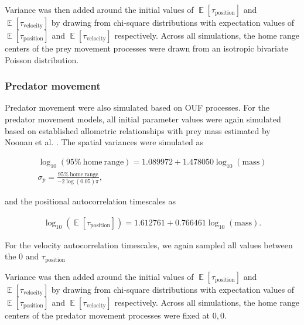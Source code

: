 \documentclass[12pt]{article}
\DeclareMathOperator{\E}{\mathbb{E}}
\begin{document}

Variance was then added around the initial values of $\E[\tau_\mathrm{position}]$ and $\E[\tau_\mathrm{velocity}]$ by drawing from chi-square distributions with expectation values of $\E[\tau_\mathrm{position}]$ and $\E[\tau_\mathrm{velocity}]$ respectively. Across all simulations, the home range centers of the prey movement processes were drawn from an isotropic bivariate Poisson distribution.

\subsubsection*{Predator movement}

Predator movement were also simulated based on OUF processes. For the predator movement models, all initial parameter values were again simulated based on established allometric relationships with prey mass estimated by Noonan et al. \cite{Noonan:2020}. The spatial variances were simulated as

\begin{gather}
\log_{10}(\mathrm{95\%~home~range}) = 1.089972 + 1.478050 \log_{10}(\mathrm{mass}) \\
\sigma_p = \frac{\mathrm{95\%~home~range}}{-2 \log(0.05)  \pi},
\end{gather}

and the positional autocorrelation timescales as

\begin{gather}
\log_{10}(\E[\tau_\mathrm{position}]) = 1.612761 + 0.766461 \log_{10}(\mathrm{mass}).
\end{gather}

For the velocity autocorrelation timescales, we again sampled all values between the 0 and $\tau_\mathrm{position}$


Variance was then added around the initial values of $\E[\tau_\mathrm{position}]$ and $\E[\tau_\mathrm{velocity}]$ by drawing from chi-square distributions with expectation values of $\E[\tau_\mathrm{position}]$ and $\E[\tau_\mathrm{velocity}]$ respectively. Across all simulations, the home range centers of the predator movement processes were fixed at $0,0$.
\end{document}
